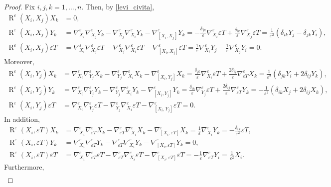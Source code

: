 \documentclass[11pt]{amsart}
\newcommand{\eps}{\varepsilon}
\DeclareMathOperator{\R}{R}
\theoremstyle{definition}
\theoremstyle{remark}
\numberwithin{equation}{section}
\begin{document}
\begin{proof}
Fix $i,j,k=1,\ldots,n$. Then, by \eqref{levi_civita},
\begin{align*}
     \R^\eps (X_i,X_j)X_k&=0,\\
     \R^\eps (X_i,X_j)Y_k&=\nabla^{\eps}_{X_i}\nabla^\eps_{X_j}Y_k-\nabla^{\eps}_{X_j}\nabla^\eps_{X_i}Y_k-\nabla^\eps_{[X_i,X_j]}Y_k=-\frac{\delta_{jk}}{\eps}\nabla^{\eps}_{X_i}\eps T+\frac{\delta_{ik}}{\eps}\nabla^{\eps}_{X_j}\eps T=\frac{1}{\eps^2}\left(\delta_{ik}Y_j-\delta_{jk}Y_i\right),\\
     \R^\eps (X_i,X_j)\eps T&=\nabla^{\eps}_{X_i}\nabla^\eps_{X_j}\eps T-\nabla^{\eps}_{X_j}\nabla^\eps_{X_i}\eps T-\nabla^\eps_{[X_i,X_j]}\eps T=\frac{1}{\eps}\nabla^{\eps}_{X_i}Y_j-\frac{1}{\eps}\nabla^{\eps}_{X_j}Y_i=0.
\end{align*}
Moreover, 
\begin{align*}
     \R^\eps (X_i,Y_j)X_k&=\nabla^{\eps}_{X_i}\nabla^\eps_{Y_j}X_k-\nabla^{\eps}_{Y_j}\nabla^\eps_{X_i}X_k-\nabla^\eps_{[X_i,Y_j]}X_k=\frac{\delta_{jk}}{\eps}\nabla^{\eps}_{X_i}\eps T+\frac{2\delta_{ij}}{\eps}\nabla^\eps_{\eps T}X_k=\frac{1}{\eps^2}\left(\delta_{jk}Y_i+2\delta_{ij}Y_k\right),\\
     \R^\eps (X_i,Y_j)Y_k&=\nabla^{\eps}_{X_i}\nabla^\eps_{Y_j}Y_k-\nabla^{\eps}_{Y_j}\nabla^\eps_{X_i}Y_k-\nabla^\eps_{[X_i,Y_j]}Y_k=\frac{\delta_{ik}}{\eps}\nabla^\eps_{Y_j}\eps T+\frac{2\delta_{ij}}{\eps}\nabla^\eps_{\eps T}Y_k=-\frac{1}{\eps^2}\left(\delta_{ik}X_j+2\delta_{ij}X_k\right),\\
     \R^\eps (X_i,Y_j)\eps T&=\nabla^{\eps}_{X_i}\nabla^\eps_{Y_j}\eps T-\nabla^{\eps}_{Y_j}\nabla^\eps_{X_i}\eps T-\nabla^\eps_{[X_i,Y_j]}\eps T=0.
\end{align*}
In addition,
\begin{align*}
     \R^\eps (X_i,\eps T)X_k&=\nabla^{\eps}_{X_i}\nabla^\eps_{\eps T}X_k-\nabla^{\eps}_{\eps T}\nabla^\eps_{X_i}X_k-\nabla^\eps_{[X_i,\eps T]}X_k=\frac{1}{\eps}\nabla^{\eps}_{X_i}Y_k=-\frac{\delta_{ik}}{\eps^2}\eps T,\\
      \R^\eps (X_i,\eps T)Y_k&=\nabla^{\eps}_{X_i}\nabla^\eps_{\eps T}Y_k-\nabla^{\eps}_{\eps T}\nabla^\eps_{X_i}Y_k-\nabla^\eps_{[X_i,\eps T]}Y_k=0,\\
       \R^\eps (X_i,\eps T)\eps T&=\nabla^{\eps}_{X_i}\nabla^\eps_{\eps T}\eps T-\nabla^{\eps}_{\eps T}\nabla^\eps_{X_i}\eps T-\nabla^\eps_{[X_i,\eps T]}\eps T=-\frac{1}{\eps}\nabla^{\eps}_{\eps T}Y_i=\frac{1}{\eps^2}X_i.
\end{align*}
Furthermore,
\begin{align*}

\end{align*}
\end{proof}
\end{document}
